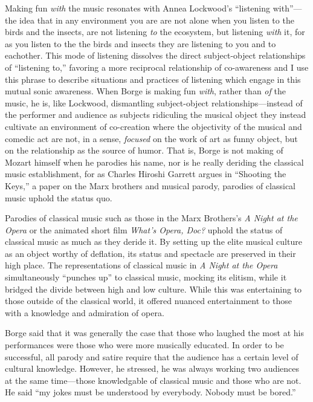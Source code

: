 \documentclass[12pt,letterpaper]{article}
\begin{document}
	Making fun \textit{with} the music resonates with Annea Lockwood's 
	``listening with''---the idea that in any 
	environment you are are not alone when you listen to the birds and the
	insects, are not listening \textit{to} the ecosystem, but listening 
	\textit{with} it, for as you listen to the the birds and insects they
	are listening to you and to eachother. This mode of listening dissolves
	 the direct 
	subject-object relationships of ``listening to,'' favoring a more 
	reciprocal relationship of co-awareness and I use this phrase to
	describe situations and practices of listening which engage in this
	mutual sonic awareness.  When Borge is making fun 
	\textit{with}, rather than \textit{of} the music, he is, like Lockwood, 
	dismantling subject-object relationships---instead of the performer and 
	audience as subjects ridiculing the musical object they instead 
	cultivate an environment of co-creation where the 
	objectivity of the musical and comedic act are not, in a sense, 
	\textit{focused} on the work of art as funny object, but on the 
	relationship as the source of humor. That is, Borge is not making of 
	Mozart himself when he parodies his name, nor is he really deriding the
 	classical music establishment, for as Charles Hiroshi Garrett argues in		``Shooting the Keys,'' a paper on the Marx brothers and musical parody, 
	parodies of classical music uphold the status 
	quo.\autocite[252]{Garrett}

	Parodies of classical music such as those in the Marx Brothers's 
	\textit{A Night at the Opera} or the animated short film 
	\textit{What's Opera, 
	Doc?} uphold the status of classical music as much as they deride it. By
	setting up the elite musical culture as an object worthy of deflation, 
	its status and spectacle are preserved in their high 
	place.\autocite[252]{Garrett} The representations of classical music in
	\textit{A Night at the Opera} simultaneously ``punches up'' to classical
	music, mocking its elitism, while it bridged the divide between high and
	low culture. While this was entertaining to those outside of the 
	classical world, it offered nuanced entertainment to those with a 
	knowledge and admiration of opera.\autocite[251]{Garrett} 

	Borge said that it was generally the case that those who laughed
	the most at his performances were those who were more musically 
	educated. In order to be successful, all parody and satire require that
	the audience has a certain level of cultural 
	knowledge.\autocite[249]{Garrett} However, he stressed, he was always 
	working two audiences at the same time---those knowledgable of classical
	music and those who are not. He said ``my jokes must be understood by 
	everybody. Nobody must be bored.''\autocite[256]{Garrett} 
\end{document}
